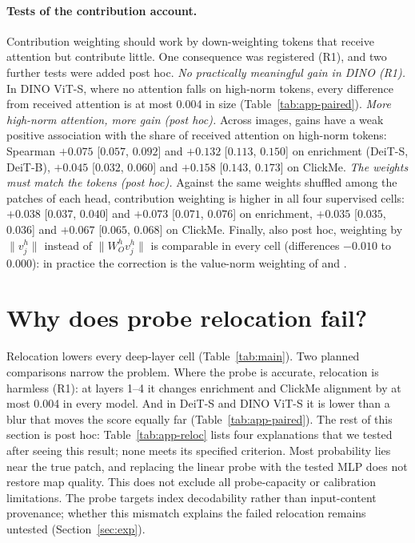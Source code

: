 \paragraph{Tests of the contribution account.} Contribution weighting should work by down-weighting tokens that receive attention but contribute little. One consequence was registered (R1), and two further tests were added post hoc. \emph{No practically meaningful gain in DINO (R1).} In DINO ViT-S, where no attention falls on high-norm tokens, every difference from received attention is at most 0.004 in size (Table~\ref{tab:app-paired}). \emph{More high-norm attention, more gain (post hoc).} Across images, gains have a weak positive association with the share of received attention on high-norm tokens: Spearman $+0.075$ [$0.057$, $0.092$] and $+0.132$ [$0.113$, $0.150$] on enrichment (DeiT-S, DeiT-B), $+0.045$ [$0.032$, $0.060$] and $+0.158$ [$0.143$, $0.173$] on ClickMe. \emph{The weights must match the tokens (post hoc).} Against the same weights shuffled among the patches of each head, contribution weighting is higher in all four supervised cells: $+0.038$ [$0.037$, $0.040$] and $+0.073$ [$0.071$, $0.076$] on enrichment, $+0.035$ [$0.035$, $0.036$] and $+0.067$ [$0.065$, $0.068$] on ClickMe. Finally, also post hoc, weighting by $\lVert v_j^h\rVert$ instead of $\lVert W_O^h v_j^h\rVert$ is comparable in every cell (differences $-0.010$ to $0.000$): in practice the correction is the value-norm weighting of \citet{kobayashi2020} and \citet{zhu2024}.

\section{Why does probe relocation fail?}
\label{app:reloc}

Relocation lowers every deep-layer cell (Table~\ref{tab:main}). Two planned comparisons narrow the problem. Where the probe is accurate, relocation is harmless (R1): at layers 1--4 it changes enrichment and ClickMe alignment by at most 0.004 in every model. And in DeiT-S and DINO ViT-S it is lower than a blur that moves the score equally far (Table~\ref{tab:app-paired}). The rest of this section is post hoc: Table~\ref{tab:app-reloc} lists four explanations that we tested after seeing this result; none meets its specified criterion. Most probability lies near the true patch, and replacing the linear probe with the tested MLP does not restore map quality. This does not exclude all probe-capacity or calibration limitations. The probe targets index decodability rather than input-content provenance; whether this mismatch explains the failed relocation remains untested (Section~\ref{sec:exp}).

